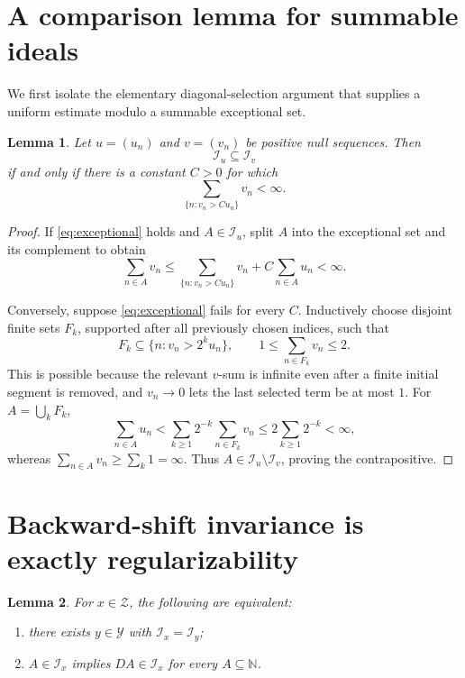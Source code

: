 \documentclass[11pt]{article}
\newtheorem{lemma}{Lemma}
\newcommand{\N}{\mathbb N}
\newcommand{\Ix}[1]{\mathcal I_{#1}}
\newcommand{\cY}{\mathscr Y}
\newcommand{\cZ}{\mathscr Z}
\begin{document}
\section{A comparison lemma for summable ideals}

We first isolate the elementary diagonal-selection argument that supplies a
uniform estimate modulo a summable exceptional set.

\begin{lemma}\label{lem:comparison}
Let $u=(u_n)$ and $v=(v_n)$ be positive null sequences.  Then
\[
 \Ix{u}\subseteq\Ix{v}
\]
if and only if there is a constant $C>0$ for which
\begin{equation}\label{eq:exceptional}
 \sum_{\{n:v_n>Cu_n\}}v_n<\infty.
\end{equation}
\end{lemma}

\begin{proof}
If \eqref{eq:exceptional} holds and $A\in\Ix{u}$, split $A$ into the
exceptional set and its complement to obtain
\[
 \sum_{n\in A}v_n
 \leq \sum_{\{n:v_n>Cu_n\}}v_n+C\sum_{n\in A}u_n<\infty.
\]

Conversely, suppose \eqref{eq:exceptional} fails for every $C$.  Inductively
choose disjoint finite sets $F_k$, supported after all previously chosen
indices, such that
\[
 F_k\subseteq\{n:v_n>2^ku_n\},
 \qquad 1\leq\sum_{n\in F_k}v_n\leq2.
\]
This is possible because the relevant $v$-sum is infinite even after a
finite initial segment is removed, and $v_n\to0$ lets the last selected term
be at most $1$.  For $A=\bigcup_kF_k$,
\[
 \sum_{n\in A}u_n
 <\sum_{k\ge1}2^{-k}\sum_{n\in F_k}v_n
 \leq2\sum_{k\ge1}2^{-k}<\infty,
\]
whereas $\sum_{n\in A}v_n\geq\sum_k1=\infty$.  Thus
$A\in\Ix{u}\setminus\Ix{v}$, proving the contrapositive.
\end{proof}

\section{Backward-shift invariance is exactly regularizability}

\begin{lemma}\label{lem:regularize}
For $x\in\cZ$, the following are equivalent:
\begin{enumerate}
 \item\label{it:regular} there exists $y\in\cY$ with $\Ix{x}=\Ix{y}$;
 \item\label{it:shift} $A\in\Ix{x}$ implies $DA\in\Ix{x}$ for every
 $A\subseteq\N$.
\end{enumerate}
\end{lemma}
\end{document}
